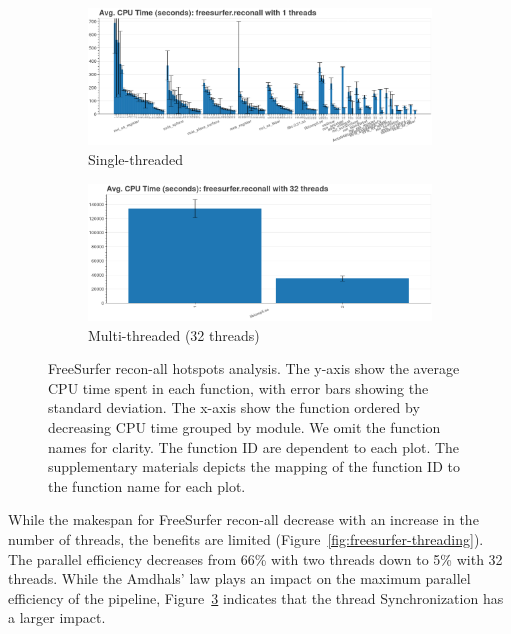 \documentclass[conference]{IEEEtran}
\begin{document}
\begin{figure}
	\centering
	\begin{subfigure}[t]{0.49\textwidth}
		\caption{Single-threaded}
		\label{subfig:hotspots-freesurfer-reconall-1thread}
		\includegraphics[width=\textwidth]{figures/hotspots-1threads-freesurfer-reconall-simple.png}
	\end{subfigure}
	\begin{subfigure}[t]{0.49\textwidth}
		\caption{Multi-threaded (32 threads)}
		\label{subfig:hotspots-freesurfer-reconall-32threads}
		\includegraphics[width=\textwidth]{figures/hotspots-32threads-freesurfer-reconall-simple.png}
	\end{subfigure}
	\caption{FreeSurfer recon-all hotspots analysis. The y-axis show the average CPU time spent in each function, with error bars showing the standard deviation. The x-axis show the function ordered by decreasing CPU time grouped by module. We omit the function names for clarity. The function ID are dependent to each plot. The supplementary materials depicts the mapping of the function ID to the function name for each plot.}
	\label{fig:hotspots-freesurfer-reconall}
\end{figure}

While the makespan for FreeSurfer recon-all decrease with an increase in the number of threads, the benefits are limited (Figure~\ref{fig:freesurfer-threading}). The parallel efficiency decreases from 66\% with two threads down to 5\% with 32 threads. While the Amdhals' law plays an impact on the maximum parallel efficiency of the pipeline, Figure~\ref{fig:hotspots-freesurfer-reconall} indicates that the thread Synchronization has a larger impact.
		
\end{document}
